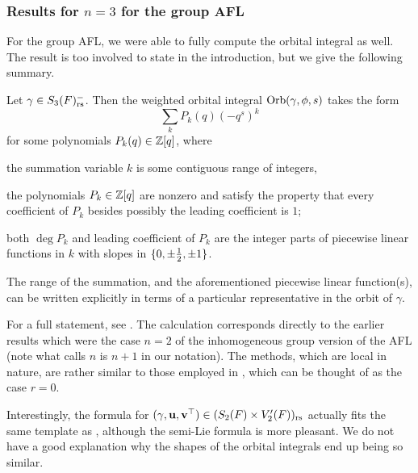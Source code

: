 \ifthesis
\subsubsection{Results for $n=3$ for the group AFL}
\label{sec:results_group_AFL}
For the group AFL, we were able to fully compute the orbital integral as well.
The result is too involved to state in the introduction,
but we give the following summary.
\begin{theorem}
  \label{thm:summary}
  Let $\gamma \in S_3(F)_{\mathrm{rs}}^-$.
  Then the weighted orbital integral $\operatorname{Orb}(\gamma, \phi, s)$ takes the form
  \[ \sum_k P_k(q) (-q^s)^k \]
  for some polynomials $P_k(q) \in \mathbb Z[q]$, where
  \begin{itemize}
    \ii the summation variable $k$ is some contiguous range of integers,

    \ii the polynomials $P_k \in \mathbb Z[q]$ are nonzero and satisfy the property
    that every coefficient of $P_k$ besides possibly the leading coefficient is $1$;

    \ii both $\deg P_k$ and leading coefficient of $P_k$ are the integer parts
    of piecewise linear functions in $k$ with slopes in $\{0, \pm\frac{1}{2}, \pm 1\}$.
  \end{itemize}
  The range of the summation, and the aforementioned piecewise linear function(s),
  can be written explicitly in terms of a particular representative
  in the orbit of $\gamma$.
\end{theorem}
For a full statement, see
.
The calculation corresponds directly to the earlier results
\cite[Lemma 7.1.1 and Proposition 7.3.2]{ref:AFLspherical}
which were the case $n = 2$ of the inhomogeneous group version of the AFL
(note what \cite{ref:AFLspherical} calls $n$ is $n+1$ in our notation).
The methods, which are local in nature,
are rather similar to those employed in \cite{ref:AFL},
which can be thought of as the case $r = 0$.

\begin{remark}
  Interestingly, the formula 
  for ${(\gamma, \mathbf u, \mathbf v^\top)} \in (S_2(F) \times V'_2(F))_{\mathrm{rs}}$
  actually fits the same template as ,
  although the semi-Lie formula is more pleasant.
  We do not have a good explanation why the shapes of the orbital integrals
  end up being so similar.
\end{remark}

